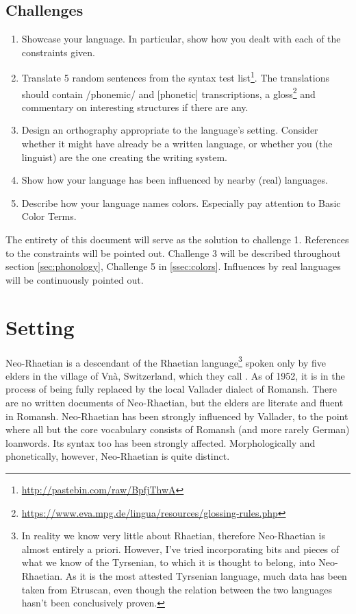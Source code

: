 \documentclass{article}
\newcommand{\con}[1]{\hspace{0pt}{\color{olive}#1}}
\newcommand{\langname}{Neo-Rhaetian}
\begin{document}
\subsection{Challenges}
\begin{enumerate}
\item Showcase your language. In particular, show how you dealt with each of the constraints given.
\item Translate 5 random sentences from the syntax test list\footnote{\url{http://pastebin.com/raw/BpfjThwA}}. The translations should contain /phonemic/ and [phonetic] transcriptions, a gloss\footnote{\url{https://www.eva.mpg.de/lingua/resources/glossing-rules.php}} and commentary on interesting structures if there are any. 
\item Design an orthography appropriate to the language’s setting. Consider whether it might have already be a written language, or whether you (the linguist) are the one creating the writing system.
\item Show how your language has been influenced by nearby (real) languages.
\item Describe how your language names colors. Especially pay attention to Basic Color Terms.
\end{enumerate}

The entirety of this document will serve as the solution to challenge 1. References to the constraints will be pointed out. Challenge 3 will be described throughout section \ref{sec:phonology}, Challenge 5 in \ref{ssec:colors}. Influences by real languages will be continuously pointed out.

\clearpage
\section{Setting}
\langname{} is a descendant of the Rhaetian language\footnote{In reality we know very little about Rhaetian, therefore \langname{} is almost entirely a priori. However, I’ve tried incorporating bits and pieces of what we know of the Tyrsenian, to which it is thought to belong, into \langname{}. As it is the most attested Tyrsenian language, much data has been taken from Etruscan, even though the relation between the two languages hasn’t been conclusively proven.} spoken only by five elders in the village of Vnà, Switzerland, which they call \con{Mans}. As of 1952, it is in the process of being fully replaced by the local Vallader dialect of Romansh. There are no written documents of \langname{}, but the elders are literate and fluent in Romansh. \langname{} has been strongly influenced by Vallader, to the point where all but the core vocabulary consists of Romansh (and more rarely German) loanwords. Its syntax too has been strongly affected. Morphologically and phonetically, however, \langname{} is quite distinct.
\end{document}
